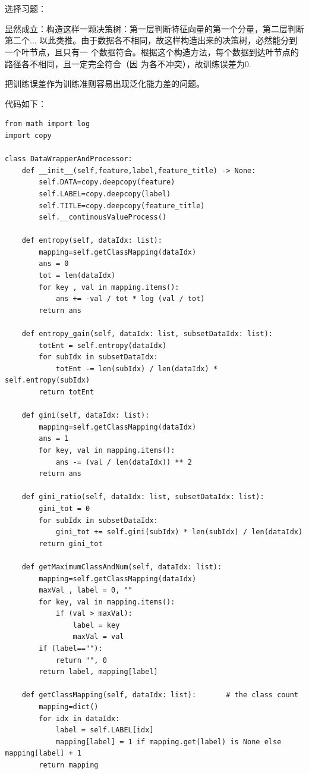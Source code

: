 \documentclass{ctexart}
\newcounter{answercnt}
\newcommand{\sCourse}{机器学习}   %
\newcommand{\nTime}{4}             %
\newcommand{\sName}{黄昊}           %
\newcommand{\sNumber}{20204205}     %
\newcommand{\homeworkTitle}{
    \setcounter{answercnt}{0}
    \begin{center}
        \fontsize{16pt}{0}{\textbf{\kaishu\sCourse课程\quad第\nTime次作业}}\\
        \fontsize{13pt}{0}{\textit{\kaishu\sName\qquad\sNumber}}\\
    \end{center}}
\begin{document}
\homeworkTitle
选择习题：\answer[4.1]\answer[4.2]\answer[4.3]\answer[4.4]\answer[4.8]

\answer[4.1]
显然成立：构造这样一颗决策树：第一层判断特征向量的第一个分量，第二层判断第二个...
以此类推。由于数据各不相同，故这样构造出来的决策树，必然能分到一个叶节点，且只有一
个数据符合。根据这个构造方法，每个数据到达叶节点的路径各不相同，且一定完全符合（因
为各不冲突），故训练误差为0.

\answer[4.2]
把训练误差作为训练准则容易出现泛化能力差的问题。

\answer[4.3]
\answer[4.4]
代码如下：
\begin{lstlisting}
from math import log
import copy

class DataWrapperAndProcessor:
    def __init__(self,feature,label,feature_title) -> None:
        self.DATA=copy.deepcopy(feature)
        self.LABEL=copy.deepcopy(label)
        self.TITLE=copy.deepcopy(feature_title)
        self.__continousValueProcess()
    
    def entropy(self, dataIdx: list):
        mapping=self.getClassMapping(dataIdx)
        ans = 0
        tot = len(dataIdx)
        for key , val in mapping.items():
            ans += -val / tot * log (val / tot)
        return ans
    
    def entropy_gain(self, dataIdx: list, subsetDataIdx: list):
        totEnt = self.entropy(dataIdx)
        for subIdx in subsetDataIdx:
            totEnt -= len(subIdx) / len(dataIdx) * self.entropy(subIdx)
        return totEnt
    
    def gini(self, dataIdx: list):
        mapping=self.getClassMapping(dataIdx)
        ans = 1
        for key, val in mapping.items():
            ans -= (val / len(dataIdx)) ** 2
        return ans
    
    def gini_ratio(self, dataIdx: list, subsetDataIdx: list):
        gini_tot = 0
        for subIdx in subsetDataIdx:
            gini_tot += self.gini(subIdx) * len(subIdx) / len(dataIdx)
        return gini_tot
    
    def getMaximumClassAndNum(self, dataIdx: list):
        mapping=self.getClassMapping(dataIdx)
        maxVal , label = 0, ""
        for key, val in mapping.items():
            if (val > maxVal):
                label = key
                maxVal = val
        if (label==""):
            return "", 0
        return label, mapping[label]        
    
    def getClassMapping(self, dataIdx: list):       # the class count
        mapping=dict()
        for idx in dataIdx:
            label = self.LABEL[idx]
            mapping[label] = 1 if mapping.get(label) is None else mapping[label] + 1
        return mapping
    

\end{lstlisting}
\end{document}
